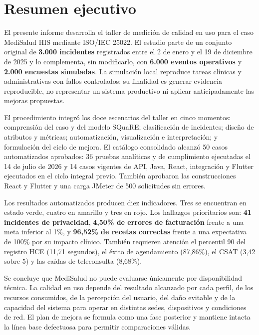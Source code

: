 \section*{Resumen ejecutivo}

El presente informe desarrolla el taller de medición de calidad en uso para el caso MediSalud HIS mediante ISO/IEC 25022. El estudio parte de un conjunto original de \textbf{3.000 incidentes} registrados entre el 2 de enero y el 19 de diciembre de 2025 y lo complementa, sin modificarlo, con \textbf{6.000 eventos operativos} y \textbf{2.000 encuestas simuladas}. La simulación local reproduce tareas clínicas y administrativas con fallos controlados; su finalidad es generar evidencia reproducible, no representar un sistema productivo ni aplicar anticipadamente las mejoras propuestas.

El procedimiento integró los doce escenarios del taller en cinco momentos: comprensión del caso y del modelo SQuaRE; clasificación de incidentes; diseño de atributos y métricas; automatización, visualización e interpretación; y formulación del ciclo de mejora. El catálogo consolidado alcanzó 50 casos automatizados aprobados: 36 pruebas analíticas y de cumplimiento ejecutadas el 14 de julio de 2026 y 14 casos vigentes de API, Java, React, integración y Flutter ejecutados en el ciclo integral previo. También aprobaron las construcciones React y Flutter y una carga JMeter de 500 solicitudes sin errores.

Los resultados automatizados producen diez indicadores. Tres se encuentran en estado verde, cuatro en amarillo y tres en rojo. Los hallazgos prioritarios son: \textbf{41 incidentes de privacidad}, \textbf{4,50\% de errores de facturación} frente a una meta inferior al 1\%, y \textbf{96,52\% de recetas correctas} frente a una expectativa de 100\% por su impacto clínico. También requieren atención el percentil 90 del registro HCE (11,71 segundos), el éxito de agendamiento (87,86\%), el CSAT (3,42 sobre 5) y las caídas de teleconsulta (8,68\%).

Se concluye que MediSalud no puede evaluarse únicamente por disponibilidad técnica. La calidad en uso depende del resultado alcanzado por cada perfil, de los recursos consumidos, de la percepción del usuario, del daño evitable y de la capacidad del sistema para operar en distintas sedes, dispositivos y condiciones de red. El plan de mejora se formula como una fase posterior y mantiene intacta la línea base defectuosa para permitir comparaciones válidas.

